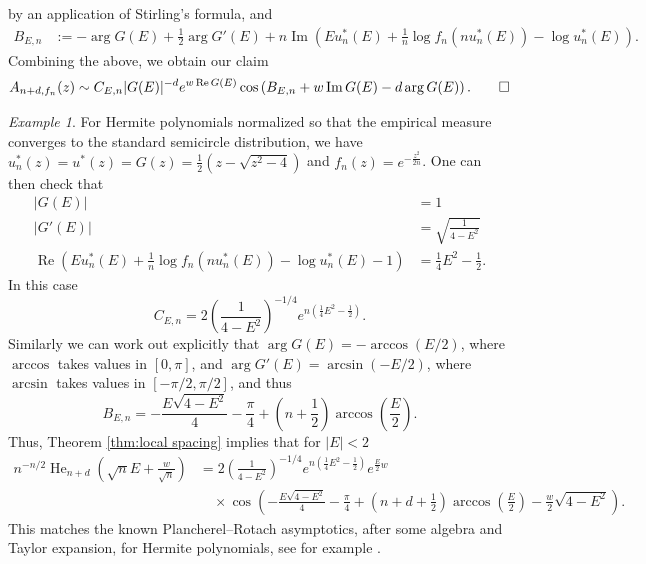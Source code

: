 \documentclass[reqno]{amsart}
\newcommand{\1}{\mathbf{1}}
\DeclareMathOperator{\He}{He}
\renewcommand\Re{\operatorname{Re}}
\renewcommand\Im{\operatorname{Im}}
\theoremstyle{plain}
\theoremstyle{definition}
\theoremstyle{remark}
\newtheorem{example}[theorem]{Example}
\numberwithin{equation}{section}
\begin{document}
		by an application of Stirling's formula, and 
		\begin{align}
		 B_{E,n}&:=-\arg G(E)+\tfrac 1 2 \arg G'(E)+ n\Im\left(Eu_n^*(E)+\tfrac{1}{n}\log f_{n}(nu_n^*(E))-\log u_n^*(E) \right).\label{eq:BEn}
		\end{align}
	Combining the above, we obtain our claim
		    \begin{align*}
		A_{n+d,f_n}(z)\sim C_{E,n}|G(E)|^{-d}e^{w\Re G(E)}\cos\left(B_{E,n}+w\Im G(E)-d\arg G(E) \right).\qed
	\end{align*}
	
	
	\begin{example}\label{ex:Hermite PR check}	
	For Hermite polynomials normalized so that the empirical measure converges to the standard semicircle distribution, we have $u_n^*(z)=u^*(z)=G(z)=\frac{1}{2}\left(z-\sqrt{z^2-4}\right)$  and $f_{n}(z)=e^{-\frac{z^2}{2n}}$. One can then check that \begin{equation*}
		\begin{aligned}
			|G(E)|&=1\\
			|G'(E)|&=\sqrt{\frac{1}{4-E^2}}\\
			\Re\left(Eu_n^*(E)+\frac{1}{n}\log f_{n}(nu_n^*(E))-\log u_n^*(E) -1\right)&=\frac{1}{4}E^2-\frac{1}{2}.
		\end{aligned}
	\end{equation*} In this case \begin{equation}
	C_{E,n}=2\left(\frac{1}{4-E^2}\right)^{-1/4}e^{n\left(\frac{1}{4}E^2-\frac{1}{2}\right)}.
	\end{equation} Similarly we can work out explicitly that $\arg G(E)=-\arccos(E/2)$, where $\arccos$ takes values in $[0,\pi]$, and $\arg G'(E)=\arcsin(-E/2)$, where $\arcsin$ takes values in $[-\pi/2,\pi/2]$, and thus \begin{equation}
	B_{E,n}=-\frac{E\sqrt{4-E^2}}{4}-\frac{\pi}{4}+\left(n+\frac{1}{2}\right)\arccos\left(\frac{E}{2}\right).
	\end{equation} Thus, Theorem \ref{thm:local spacing} implies that for $|E|<2$ \begin{equation}\label{eq:Hermite PR our version}
	\begin{aligned}
		n^{-n/2}\He_{n+d}\left(\sqrt{n}E+\frac{w}{\sqrt{n}}\right)&=2\left(\frac{1}{4-E^2}\right)^{-1/4}e^{n\left(\frac{1}{4}E^2-\frac{1}{2}\right)}e^{\frac{E}{2}w}\\
		&\quad\times\cos\left(-\frac{E\sqrt{4-E^2}}{4}-\frac{\pi}{4}+\left(n+d+\frac{1}{2}\right)\arccos\left(\frac{E}{2}\right)-\frac{w}{2}\sqrt{4-E^2}\right).
	\end{aligned}
	\end{equation} This matches the known Plancherel--Rotach asymptotics, after some algebra and Taylor expansion, for Hermite polynomials, see for example \cite[\S 18.15(v)]{NIST:DLMF}.
		\end{example}
	
\end{document}

